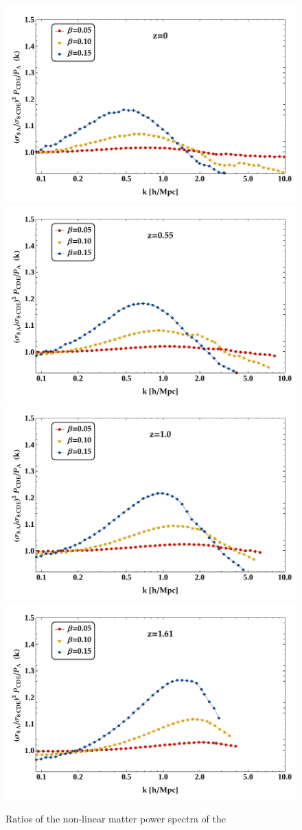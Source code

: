 \begin{figure}
\begin{centering}
\includegraphics[width=0.5\columnwidth]{Chapters/fitting-funcs/figures/ratioPk-z000}
\includegraphics[width=0.5\columnwidth]{Chapters/fitting-funcs/figures/ratioPk-z055}\\
\includegraphics[width=0.5\columnwidth]{Chapters/fitting-funcs/figures/ratioPk-z100}
\includegraphics[width=0.5\columnwidth]{Chapters/fitting-funcs/figures/ratioPk-z161} 
\par\end{centering}
\caption[Ratios to $\lcdm$ of the non-linear matter power spectra in the  simulations]
{Ratios of the non-linear matter power spectra of the 
}
\end{figure}
